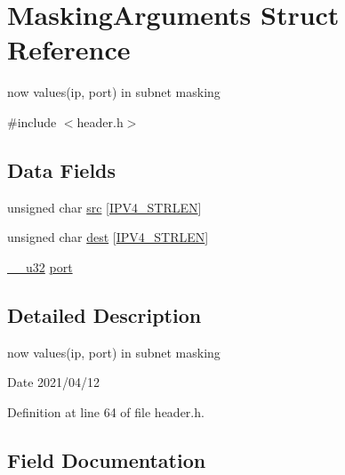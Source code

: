 \hypertarget{struct_masking_arguments}{}\section{Masking\+Arguments Struct Reference}
\label{struct_masking_arguments}


now values(ip, port) in subnet masking  




{\ttfamily \#include $<$header.\+h$>$}

\subsection*{Data Fields}
\begin{DoxyCompactItemize}
\item 
unsigned char \hyperlink{struct_masking_arguments_a70b9300e7d151f7aadcba8a1c81f3fd9}{src} \mbox{[}\hyperlink{header_8h_ad5057f0ae40bc5ff36e7c9e65ea6c457}{I\+P\+V4\+\_\+\+S\+T\+R\+L\+EN}\mbox{]}
\item 
unsigned char \hyperlink{struct_masking_arguments_a2fbdfdcfd2976c224421d481d0935d8d}{dest} \mbox{[}\hyperlink{header_8h_ad5057f0ae40bc5ff36e7c9e65ea6c457}{I\+P\+V4\+\_\+\+S\+T\+R\+L\+EN}\mbox{]}
\item 
\hyperlink{asm__types_8h_a3acae9310e2c2e411e800a8a369171c6}{\+\_\+\+\_\+u32} \hyperlink{struct_masking_arguments_a14bfc613b878123fb95556e7a098089d}{port}
\end{DoxyCompactItemize}


\subsection{Detailed Description}
now values(ip, port) in subnet masking 

\begin{DoxyDate}{Date}
2021/04/12 
\end{DoxyDate}


Definition at line 64 of file header.\+h.



\subsection{Field Documentation}
\mbox{\label{struct_masking_arguments_a2fbdfdcfd2976c224421d481d0935d8d}} 
